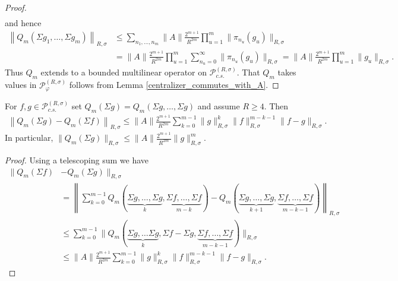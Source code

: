 \begin{proof}
\begin{align*}
	\end{align*}
and hence
	\begin{align*}
		\left\| Q_m(\Sigma g_1,\ldots,\Sigma g_m)\right\|_{R,\sigma} &\leq \sum_{n_1,\ldots, n_m} \|A\|\frac{2^{m+1}}{R^{2m}} \prod_{u=1}^m \|\pi_{n_u}(g_u)\|_{R,\sigma} \\
				&= \|A\| \frac{2^{m+1}}{R^{2m}} \prod_{u=1}^m \sum_{n_u=0}^\infty \|\pi_{n_u}(g_u)\|_{R,\sigma}=\|A\|\frac{2^{m+1}}{R^{2m}} \prod_{u=1}^m \|g_u\|_{R,\sigma}.
	\end{align*}
Thus $Q_m$ extends to a bounded multilinear operator on $\mathscr{P}^{(R,\sigma)}_{c.s.}$. That $Q_m$ takes values in $\mathscr{P}^{(R,\sigma)}_\varphi$ follows from Lemma \ref{centralizer_commutes_with_A}.
\end{proof}

\begin{lem}\label{Q_m}
For $f,g\in \mathscr{P}_{c.s.}^{(R,\sigma)}$ set $Q_m(\Sigma g)=Q_m(\Sigma g,\ldots, \Sigma g)$ and assume $R\geq4$. Then
	\begin{align*}
		\left\| Q_m(\Sigma g)- Q_m(\Sigma f)\right\|_{R,\sigma} \leq \|A\|\frac{2^{m+1}}{R^{2m}} \sum_{k=0}^{m-1} \|g\|_{R,\sigma}^k \|f\|_{R,\sigma}^{m-k-1} \|f-g\|_{R,\sigma}.
	\end{align*}
In particular, $\|Q_m(\Sigma g)\|_{R,\sigma}\leq \|A\| \frac{2^{m+1}}{R^{2m}} \|g\|_{R,\sigma}^m$.
\end{lem}
\begin{proof}
Using a telescoping sum we have
	\begin{align*}
		\|Q_m(\Sigma f)&-Q_m(\Sigma g)\|_{R,\sigma}\\
			&=\left\| \sum_{k=0}^{m-1} Q_m(\underbrace{\Sigma g,\ldots,\Sigma g}_k,\underbrace{\Sigma f,\ldots,\Sigma f}_{m-k})-Q_m(\underbrace{\Sigma g,\ldots,\Sigma g}_{k+1},\underbrace{\Sigma f,\ldots,\Sigma f}_{m-k-1})\right\|_{R,\sigma}\\
					&\leq \sum_{k=0}^{m-1} \| Q_m(\underbrace{\Sigma g,\ldots \Sigma g}_{k},\Sigma f-\Sigma g,\underbrace{\Sigma f,\ldots,\Sigma f}_{m-k-1})\|_{R,\sigma}\\
					&\leq  \|A\| \frac{2^{m+1}}{R^{2m}} \sum_{k=0}^{m-1}\|g\|_{R,\sigma}^k\|f\|_{R,\sigma}^{m-k-1}\|f-g\|_{R,\sigma}.
	\end{align*}
\end{proof}

